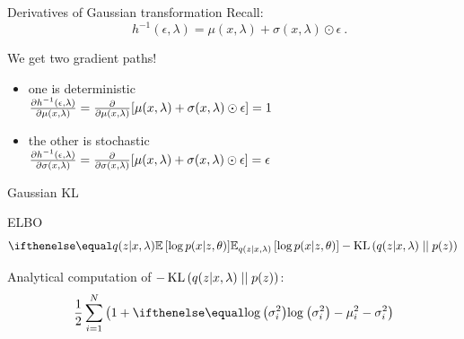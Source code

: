 \documentclass[14pt]{beamer}
\begin{document}
\begin{frame}{Derivatives of Gaussian transformation}
Recall: $$\quad h^{-1}(\epsilon, \lambda) = \mu(x,\lambda) + \sigma(x,\lambda) \odot \epsilon \ . $$

We get two gradient paths! \pause \\

\begin{itemize}
	\item one is \alert{deterministic}\\
	$\pdv{h^{-1}(\epsilon, \lambda)}{\mu(x,\lambda)} = \pdv{\mu(x,\lambda)}[\mu(x,\lambda) + \sigma(x,\lambda) \odot \epsilon] = 1$ \pause
	\item the other is  \alert{stochastic}\\
	$\pdv{h^{-1}(\epsilon, \lambda)}{\sigma(x,\lambda)} = \pdv{\sigma(x,\lambda)}[ \mu(x,\lambda) + \sigma(x,\lambda) \odot \epsilon] = \epsilon$
\end{itemize}

\end{frame}

\begin{frame}{Gaussian KL}
\begin{block}{ELBO}
\begin{equation*}
\E[q(z|x,\lambda)]{\log p(x|z,\theta)} - \KL{q(z|x,\lambda)}{p(z)}
\end{equation*}
\end{block}
\pause
Analytical computation of $ -\operatorname{KL}\left(q(z|x,\lambda)\mid\mid p(z)\right) $:
\begin{equation*}
\frac{1}{2}\sum_{i=1}^{N}\left(1 + \loga{\sigma^{2}_{i}} -
\mu^{2}_{i} - \sigma^{2}_{i} \right)
\end{equation*}
\end{frame}
\end{document}
